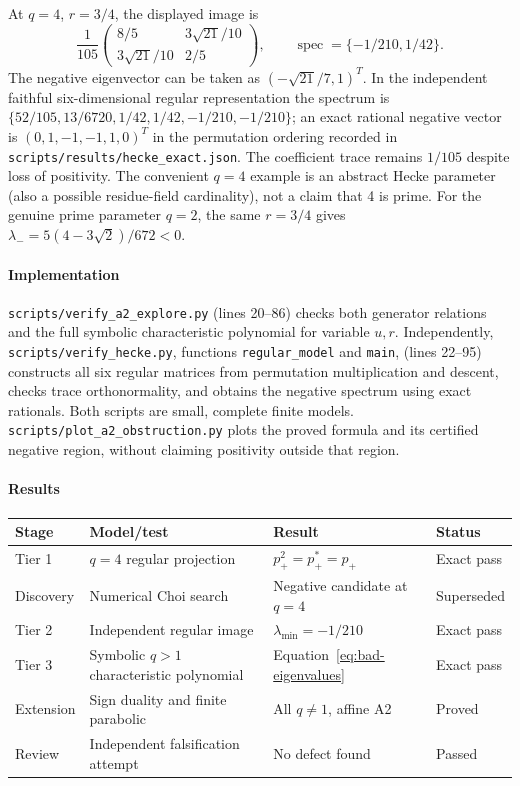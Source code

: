\documentclass[11pt]{article}
\theoremstyle{remark}\newtheorem{remark}[definition]{Remark}
\begin{document}
At $q=4$, $r=3/4$, the displayed image is
\[
 \frac1{105}\begin{pmatrix}8/5&3\sqrt{21}/10\\
 3\sqrt{21}/10&2/5\end{pmatrix},\qquad
 \operatorname{spec}=\{-1/210,1/42\}.
\]
The negative eigenvector can be taken as $(-\sqrt{21}/7,1)^T$.
In the independent faithful six-dimensional regular representation the
spectrum is
$\{52/105,13/6720,1/42,1/42,-1/210,-1/210\}$;
an exact rational negative vector is $(0,1,-1,-1,1,0)^T$ in the permutation
ordering recorded in \texttt{scripts/results/hecke\_exact.json}.
The coefficient trace remains $1/105$ despite loss of positivity.
The convenient $q=4$ example is an abstract Hecke parameter (also a possible
residue-field cardinality), not a claim that 4 is prime.
For the genuine prime parameter $q=2$, the same $r=3/4$ gives
$\lambda_-=5(4-3\sqrt2)/672<0$.

\paragraph{Implementation} \texttt{scripts/verify\_a2\_explore.py}
(lines 20--86) checks both generator relations and the full symbolic characteristic
polynomial for variable $u,r$. Independently,
\texttt{scripts/verify\_hecke.py}, functions \texttt{regular\_model} and
\texttt{main}, (lines 22--95) constructs all six regular matrices from permutation
multiplication and descent, checks trace orthonormality, and obtains the
negative spectrum using exact rationals. Both scripts are small, complete
finite models. \texttt{scripts/plot\_a2\_obstruction.py} plots the proved
formula and its certified negative region, without claiming positivity
outside that region.
\paragraph{Results}
{\setlength{\tabcolsep}{8pt}\renewcommand{\arraystretch}{1.2}
\begin{tabular}{p{.10\linewidth}p{.32\linewidth}p{.30\linewidth}p{.12\linewidth}}\toprule
Stage & Model/test & Result & Status\\\midrule
Tier 1 & $q=4$ regular projection & $p_+^2=p_+^*=p_+$ & Exact pass\\
Discovery & Numerical Choi search & Negative candidate at $q=4$ & Superseded\\
Tier 2 & Independent regular image & $\lambda_{\min}=-1/210$ & Exact pass\\
Tier 3 & Symbolic $q>1$ characteristic polynomial & Equation~\eqref{eq:bad-eigenvalues} & Exact pass\\
Extension & Sign duality and finite parabolic & All $q\ne1$, affine A2 & Proved\\
Review & Independent falsification attempt & No defect found & Passed\\\bottomrule
\end{tabular}}
\end{document}
